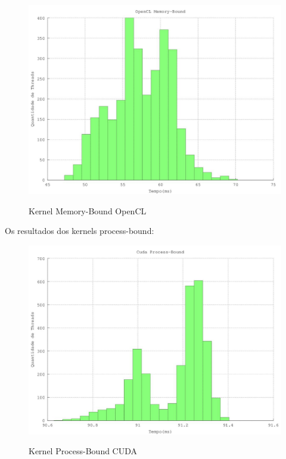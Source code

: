 \begin{figure}[H]
  \begin{center}
    \includegraphics[scale=0.6]{resultados_opencl_memory_histo.jpg}
    \label{fig:Kernel Memory-Bound OpenCL}
    \caption{Kernel Memory-Bound OpenCL}
  \end{center}
\end{figure}

Os resultados dos kernels process-bound:

\begin{figure}[H]
  \begin{center}
    \includegraphics[scale=0.6]{resultados_cuda_process_histo.jpg}
    \label{fig:Kernel Process-Bound CUDA}
    \caption{Kernel Process-Bound CUDA}
  \end{center}
\end{figure}

